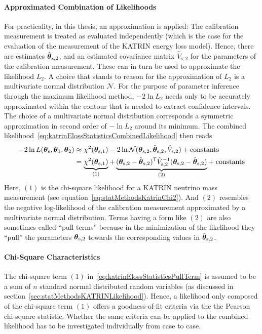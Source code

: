 \paragraph{Approximated Combination of Likelihoods}
For practicality, in this thesis, an approximation is applied: The calibration measurement is treated as evaluated independently (which is the case for the evaluation of the measurement of the KATRIN energy loss model). Hence, there are estimates $\hat{\boldsymbol{\mathbf{\theta}}}_\mathrm{s,2}$, and an estimated covariance matrix $\hat{V}_\mathrm{s,2}$ for the parameters of the calibration measurement. These can in turn be used to approximate the likelihood $L_2$. A choice that stands to reason for the approximation of $L_2$ is a multivariate normal distribution $\mathcal{N}$. For the purpose of parameter inference through the maximum likelihood method, $-2\ln L_2$ needs only to be accurately approximated within the contour that is needed to extract confidence intervals. The choice of a multivariate normal distribution corresponds a symmetric approximation in second order of $-\ln L_2$ around its minimum. The combined likelihood~\eqref{eq:katrinElossStatisticsCombinedLikelihood} then reads
\begin{equation}
\begin{split}
\label{eq:katrinElossStatisticsPullTerm}
-2\ln L(\paramVecShared, \paramVec_1, \paramVec_2) &\approx
\chi^2(\paramVecSOne) 
-2\ln \mathcal{N}(\paramVecSTwo, \hat{\paramVec}_\mathrm{s,2}, \hat{V}_\mathrm{s,2}) +
\mathrm{ constants}\\ &=
\underbrace{
	\chi^2(\paramVecSOne)
	\vphantom{(\paramVecSTwo - \hat{\paramVec}_\mathrm{s,2})^{\mathsf{T}}}
}_{(1)}
+
\underbrace{
	(\paramVec_\mathrm{s,2} - \hat{\paramVec}_\mathrm{s,2})^{\mathsf{T}}
	\hat{V}_\mathrm{s,2}^{-1}
	(\paramVec_\mathrm{s,2} - \hat{\paramVec}_\mathrm{s,2})
}_{(2)} +\; 
\mathrm{ constants}
\end{split}
\end{equation}
Here, $(1)$ is the chi-square likelihood for a KATRIN neutrino mass measurement (see equation~\ref{eq:statMethodsKatrinChi2}). And $(2)$ resembles the negative log-likelihood of the calibration measurement approximated by a multivariate normal distribution. Terms having a form like $(2)$ are also sometimes called ``pull terms'' because in the minimization of the likelihood they ``pull'' the parameters $\boldsymbol{\mathbf{\theta}}_\mathrm{s,2}$ towards the corresponding values in $\hat{\boldsymbol{\mathbf{\theta}}}_\mathrm{s,2}$.

\paragraph{Chi-Square Characteristics}
The chi-square term $(1)$ in~\eqref{eq:katrinElossStatisticsPullTerm} is assumed to be a sum of $n$ standard normal distributed random variables (as discussed in section~\ref{sec:statMethodsKATRINLikelihood}). Hence, a likelihood only composed of the chi-square term $(1)$ offers a goodness-of-fit criteria via the the Pearson chi-square statistic. Whether the same criteria can be applied to the combined likelihood has to be investigated individually from case to case.

